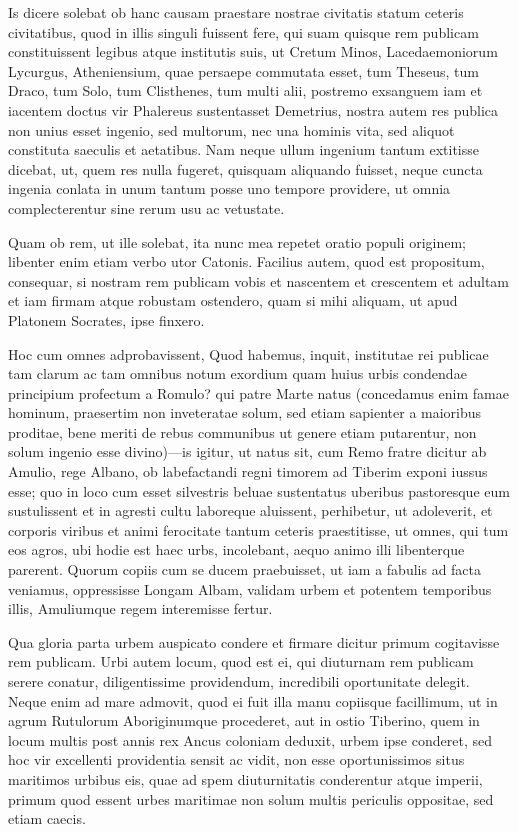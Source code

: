  Is dicere solebat ob hanc causam praestare nostrae civitatis statum ceteris civitatibus, quod in illis singuli fuissent fere, qui suam quisque rem publicam constituissent legibus atque institutis suis, ut Cretum Minos, Lacedaemoniorum Lycurgus, Atheniensium, quae persaepe commutata esset, tum Theseus, tum Draco, tum Solo, tum Clisthenes, tum multi alii, postremo exsanguem iam et iacentem doctus vir Phalereus sustentasset Demetrius, nostra autem res publica non unius esset ingenio, sed multorum, nec una hominis vita, sed aliquot constituta saeculis et aetatibus. Nam neque ullum ingenium tantum extitisse dicebat, ut, quem res nulla fugeret, quisquam aliquando fuisset, neque cuncta ingenia conlata in unum tantum posse uno tempore providere, ut omnia complecterentur sine rerum usu ac vetustate.

 Quam ob rem, ut ille solebat, ita nunc mea repetet oratio populi originem; libenter enim etiam verbo utor Catonis. Facilius autem, quod est propositum, consequar, si nostram rem publicam vobis et nascentem et crescentem et adultam et iam firmam atque robustam ostendero, quam si mihi aliquam, ut apud Platonem Socrates, ipse finxero.

 Hoc cum omnes adprobavissent, Quod habemus, inquit, institutae rei publicae tam clarum ac tam omnibus notum exordium quam huius urbis condendae principium profectum a Romulo? qui patre Marte natus (concedamus enim famae hominum, praesertim non inveteratae solum, sed etiam sapienter a maioribus proditae, bene meriti de rebus communibus ut genere etiam putarentur, non solum ingenio esse divino)—is igitur, ut natus sit, cum Remo fratre dicitur ab Amulio, rege Albano, ob labefactandi regni timorem ad Tiberim exponi iussus esse; quo in loco cum esset silvestris beluae sustentatus uberibus pastoresque eum sustulissent et in agresti cultu laboreque aluissent, perhibetur, ut adoleverit, et corporis viribus et animi ferocitate tantum ceteris praestitisse, ut omnes, qui tum eos agros, ubi hodie est haec urbs, incolebant, aequo animo illi libenterque parerent. Quorum copiis cum se ducem praebuisset, ut iam a fabulis ad facta veniamus, oppressisse Longam Albam, validam urbem et potentem temporibus illis, Amuliumque regem interemisse fertur.

 Qua gloria parta urbem auspicato condere et firmare dicitur primum cogitavisse rem publicam. Urbi autem locum, quod est ei, qui diuturnam rem publicam serere conatur, diligentissime providendum, incredibili oportunitate delegit. Neque enim ad mare admovit, quod ei fuit illa manu copiisque facillimum, ut in agrum Rutulorum Aboriginumque procederet, aut in ostio Tiberino, quem in locum multis post annis rex Ancus coloniam deduxit, urbem ipse conderet, sed hoc vir excellenti providentia sensit ac vidit, non esse oportunissimos situs maritimos urbibus eis, quae ad spem diuturnitatis conderentur atque imperii, primum quod essent urbes maritimae non solum multis periculis oppositae, sed etiam caecis.

